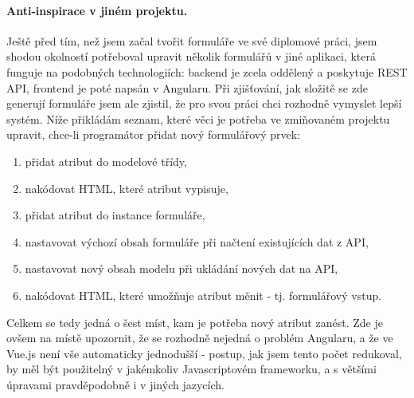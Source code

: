 \paragraph{Anti-inspirace v jiném projektu.} Ještě před tím, než jsem začal tvořit formuláře ve své diplomové práci, jsem shodou okolností potřeboval upravit několik formulářů v jiné aplikaci, která funguje na podobných technologiích: backend je zcela oddělený a poskytuje REST API, frontend je poté napsán v Angularu. Při zjišťování, jak složitě se zde generují formuláře jsem ale zjistil, že pro svou práci chci rozhodně vymyslet lepší systém. Níže přikládám seznam, které věci je potřeba ve zmiňovaném projektu upravit, chce-li programátor přidat nový formulářový prvek:

\begin{enumerate}
    \item přidat atribut do modelové třídy,
    \item nakódovat HTML, které atribut vypisuje,
    \item přidat atribut do instance formuláře,
    \item nastavovat výchozí obsah formuláře při načtení existujících dat z API,
    \item nastavovat nový obsah modelu při ukládání nových dat na API,
    \item nakódovat HTML, které umožňuje atribut měnit - tj. formulářový vstup.
\end{enumerate}

Celkem se tedy jedná o šest míst, kam je potřeba nový atribut zanést. Zde je ovšem na místě upozornit, že se rozhodně nejedná o problém Angularu, a že ve Vue.js není vše automaticky jednodušší - postup, jak jsem tento počet redukoval, by měl být použitelný v jakémkoliv Javascriptovém frameworku, a s většími úpravami pravděpodobně i v jiných jazycích.\\

